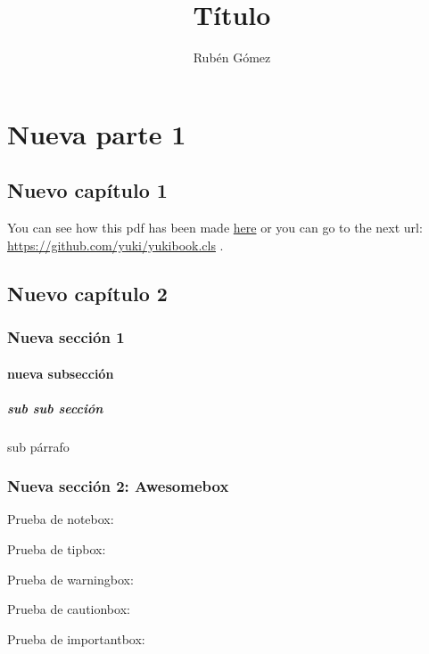 \documentclass{yukibook}
\title{Título}
\author{Rubén Gómez}
\begin{document}
\maketitle
\tableofcontents

\part{Nueva parte 1}

\chapter{Nuevo capítulo 1}
You can see how this pdf has been made \href{https://github.com/yuki/yukibook.cls}{here} or you can go to the next url: \url{https://github.com/yuki/yukibook.cls} .


\Blindtext[2]

\chapter{Nuevo capítulo 2}
\Blindtext[2]

\section{Nueva sección 1}
\Blindtext[2]

\subsection{nueva subsección}
\Blindtext[1]

\subsubsection{sub sub sección}
\Blindtext[1]

\subparagraph{sub párrafo}
\Blindtext[1]

\section{Nueva sección 2: Awesomebox}
Prueba de notebox:
\notebox{\Blindtext[1]}

Prueba de tipbox:
\tipbox{\Blindtext[1]}

Prueba de warningbox:
\warningbox{\Blindtext[1]}

Prueba de cautionbox:
\cautionbox{\Blindtext[1]}

Prueba de importantbox:
\importantbox{\Blindtext[1]}


\begin{info-box}
  \notebox{\Blindtext[1]}
\end{info-box}
\begin{warning-box}
  \Blindtext[1]
\end{warning-box}
\begin{error-box}
  \Blindtext[1]
\end{error-box}

\Blinddocument
\end{document}
